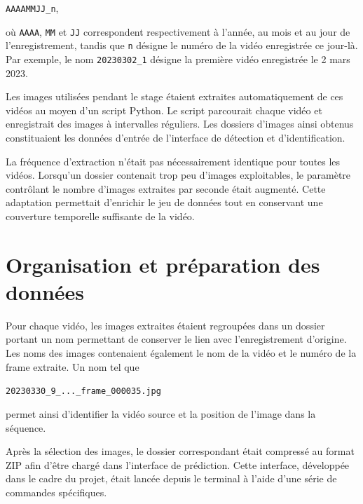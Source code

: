 \documentclass[11pt,a4paper]{report}
\begin{document}
\begin{center}
    \texttt{AAAAMMJJ\_n},
\end{center}

où \texttt{AAAA}, \texttt{MM} et \texttt{JJ} correspondent respectivement à
l'année, au mois et au jour de l'enregistrement, tandis que \texttt{n} désigne
le numéro de la vidéo enregistrée ce jour-là. Par exemple, le nom
\texttt{20230302\_1} désigne la première vidéo enregistrée le 2 mars 2023.

Les images utilisées pendant le stage étaient extraites automatiquement de ces
vidéos au moyen d'un script Python. Le script parcourait chaque vidéo et
enregistrait des images à intervalles réguliers. Les dossiers d'images ainsi
obtenus constituaient les données d'entrée de l'interface de détection et
d'identification.

La fréquence d'extraction n'était pas nécessairement identique pour toutes les
vidéos. Lorsqu'un dossier contenait trop peu d'images exploitables, le paramètre
contrôlant le nombre d'images extraites par seconde était augmenté. Cette
adaptation permettait d'enrichir le jeu de données tout en conservant une
couverture temporelle suffisante de la vidéo.

\section{Organisation et préparation des données}

Pour chaque vidéo, les images extraites étaient regroupées dans un dossier
portant un nom permettant de conserver le lien avec l'enregistrement d'origine.
Les noms des images contenaient également le nom de la vidéo et le numéro de la
frame extraite. Un nom tel que

\begin{center}
    \texttt{20230330\_9\_...\_frame\_000035.jpg}
\end{center}

permet ainsi d'identifier la vidéo source et la position de l'image dans la
séquence.

Après la sélection des images, le dossier correspondant était compressé au
format ZIP afin d'être chargé dans l'interface de prédiction. Cette interface,
développée dans le cadre du projet, était lancée depuis le terminal à l'aide
d'une série de commandes spécifiques.
\end{document}
